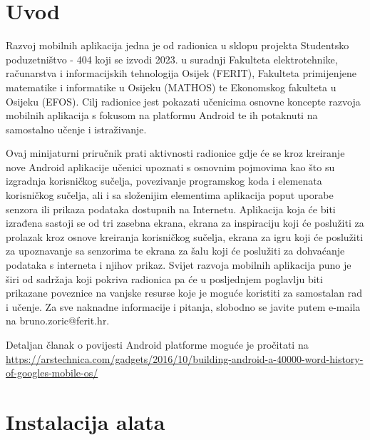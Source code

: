\documentclass[11pt,a4paper,twoside]{article}
\begin{document}


\renewcommand{\cftsecleader}{\cftdotfill{\cftdotsep}}
\tableofcontents
\newpage
	
\section{Uvod}

	Razvoj mobilnih aplikacija jedna je od radionica u sklopu projekta Studentsko poduzetništvo - 404 koji se izvodi 2023. u suradnji Fakulteta elektrotehnike, računarstva i informacijskih tehnologija Osijek (FERIT), Fakulteta primijenjene matematike i informatike u Osijeku (MATHOS) te Ekonomskog fakulteta u Osijeku (EFOS). Cilj radionice jest pokazati učenicima osnovne koncepte razvoja mobilnih aplikacija s fokusom na platformu Android te ih potaknuti na samostalno učenje i istraživanje.
	
	Ovaj minijaturni priručnik prati aktivnosti radionice gdje će se kroz kreiranje nove Android aplikacije učenici upoznati s osnovnim pojmovima kao što su izgradnja korisničkog sučelja, povezivanje programskog koda i elemenata korisničkog sučelja, ali i sa složenijim elementima aplikacija poput uporabe senzora ili prikaza podataka dostupnih na Internetu. Aplikacija koja će biti izrađena sastoji se od tri zasebna ekrana, ekrana za inspiraciju koji će poslužiti za prolazak kroz osnove kreiranja korisničkog sučelja, ekrana za igru koji će poslužiti za upoznavanje sa senzorima te ekrana za šalu koji će poslužiti za dohvaćanje podataka s interneta i njihov prikaz. Svijet razvoja mobilnih aplikacija puno je širi od sadržaja koji pokriva radionica pa će u posljednjem poglavlju biti prikazane poveznice na vanjske resurse koje je moguće koristiti za samostalan rad i učenje. Za sve naknadne informacije i pitanja, slobodno se javite putem e-maila na bruno.zoric@ferit.hr.
	
	\begin{infoBox}		
		Detaljan članak o povijesti Android platforme moguće je pročitati na  \url{https://arstechnica.com/gadgets/2016/10/building-android-a-40000-word-history-of-googles-mobile-os/}
	\end{infoBox}
	
\section{Instalacija alata}
\end{document}
